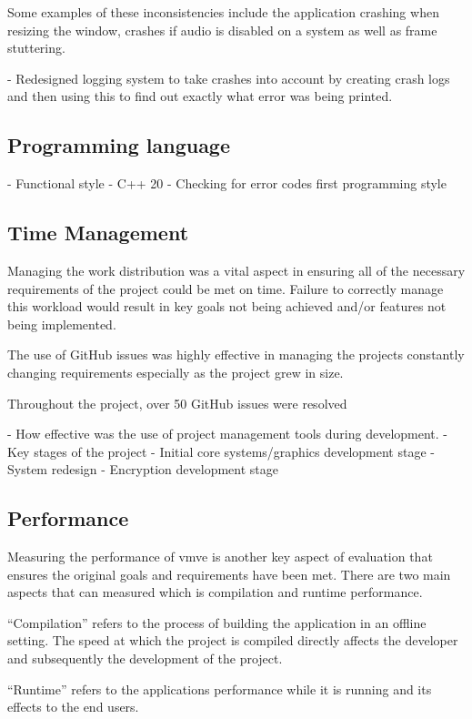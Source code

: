\documentclass[11pt]{article}
\begin{document}
Some examples of these inconsistencies include the application crashing when
resizing the window, crashes if audio is disabled on a system as well as frame
stuttering.

- Redesigned logging system to take crashes into account by creating crash logs
 and then using this to find out exactly what error was being printed.

\subsection{Programming language}
- Functional style
- C++ 20
- Checking for error codes first programming style

\subsection{Time Management}
Managing the work distribution was a vital aspect in ensuring all of the
necessary requirements of the project could be met on time. Failure to correctly 
manage this workload would result in key goals not being achieved and/or features
not being implemented.



The use of GitHub issues was highly effective in managing the projects
constantly changing requirements especially as the project grew in size.

Throughout the project, over 50 GitHub issues were resolved 

- How effective was the use of project management tools
during development.
- Key stages of the project
    - Initial core systems/graphics development stage
    - System redesign
    - Encryption development stage

\subsection{Performance}
Measuring the performance of \gls{vmve} is another key aspect of evaluation that
ensures the original goals and requirements have been met. There are two main aspects
that can measured which is compilation and runtime performance.

``Compilation'' refers to the process of building the application in an offline
setting. The speed at which the project is compiled directly affects the
developer and subsequently the development of the project.

``Runtime'' refers to the applications performance while it is running and its
effects to the end users.
\end{document}
